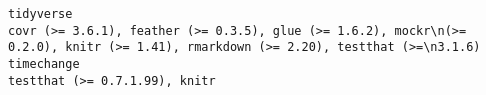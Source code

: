 \documentclass[
  letterpaper,
  DIV=11,
  numbers=noendperiod]{scrreprt}
\begin{document}
\begin{verbatim}
tidyverse                                                                                                                                                                                                                                                                                                                                                                                                                                                                                                                                                                                                                                                                                                                                                                                                                                                                                                                                                                                                                                                                                                                                                                 covr (>= 3.6.1), feather (>= 0.3.5), glue (>= 1.6.2), mockr\n(>= 0.2.0), knitr (>= 1.41), rmarkdown (>= 2.20), testthat (>=\n3.1.6)
timechange                                                                                                                                                                                                                                                                                                                                                                                                                                                                                                                                                                                                                                                                                                                                                                                                                                                                                                                                                                                                                                                                                                                                                                                                                                                                      testthat (>= 0.7.1.99), knitr

\end{verbatim}
\end{document}
